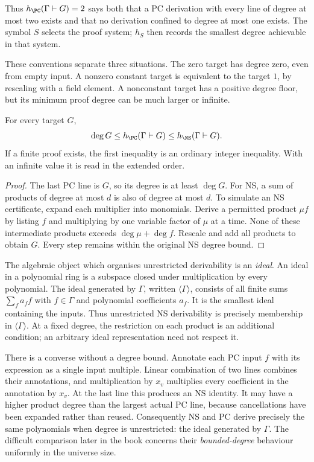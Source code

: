 Thus $h_{\PC}(\Gamma\vdash G)=2$ says both that a PC derivation with
every line of degree at most two exists and that no derivation confined
to degree at most one exists. The symbol $S$ selects the proof system;
$h_S$ then records the smallest degree achievable in that system.

These conventions separate three situations. The zero target has degree
zero, even from empty input. A nonzero constant target is equivalent to
the target $1$, by rescaling with a field element. A nonconstant target
has a positive degree floor, but its minimum proof degree can be much
larger or infinite.

\begin{proposition}\label{tx:prop:basic-comparison}
For every target $G$,
\begin{equation}\label{tx:eq:basic-comparison}
 \deg G\le h_{\PC}(\Gamma\vdash G)
          \le h_{\NS}(\Gamma\vdash G).
\end{equation}
If a finite proof exists, the first inequality is an ordinary integer
inequality. With an infinite value it is read in the extended order.
\end{proposition}
\begin{proof}
The last PC line is $G$, so its degree is at least $\deg G$. For NS,
a sum of products of degree at most $d$ is also of degree at most $d$.
To simulate an NS certificate, expand each multiplier into monomials.
Derive a permitted product $\mu f$ by listing $f$ and multiplying by
one variable factor of $\mu$ at a time. None of these intermediate
products exceeds $\deg\mu+\deg f$. Rescale and add all products to
obtain $G$. Every step remains within the original NS degree bound.
\end{proof}

The algebraic object which organises unrestricted derivability is an
\emph{ideal}. An ideal in a polynomial ring is a subspace closed under
multiplication by every polynomial. The ideal generated by $\Gamma$,
written $\langle\Gamma\rangle$, consists of all finite sums
$\sum_f a_ff$ with $f\in\Gamma$ and polynomial coefficients $a_f$.
It is the smallest ideal containing the inputs. Thus unrestricted NS
derivability is precisely membership in $\langle\Gamma\rangle$.
At a fixed degree, the restriction on each product is an additional
condition; an arbitrary ideal representation need not respect it.

There is a converse without a degree bound. Annotate each PC input $f$
with its expression as a single input multiple. Linear combination of
two lines combines their annotations, and multiplication by $x_v$
multiplies every coefficient in the annotation by $x_v$. At the last
line this produces an NS identity. It may have a higher product degree
than the largest actual PC line, because cancellations have been
expanded rather than reused. Consequently NS and PC derive precisely
the same polynomials when degree is unrestricted: the ideal generated
by $\Gamma$. The difficult comparison later in the book concerns their
\emph{bounded-degree} behaviour uniformly in the universe size.

